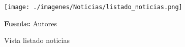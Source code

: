 \begin{figure}[!htb]
  \begin{center}
\texttt{[image: ./imagenes/Noticias/listado\_noticias.png]}
    \caption{Vista listado noticias}
    \label{fig:Vista_listado_noticias}
    \textbf{Fuente:}  Autores
  \end{center}
\end{figure}
